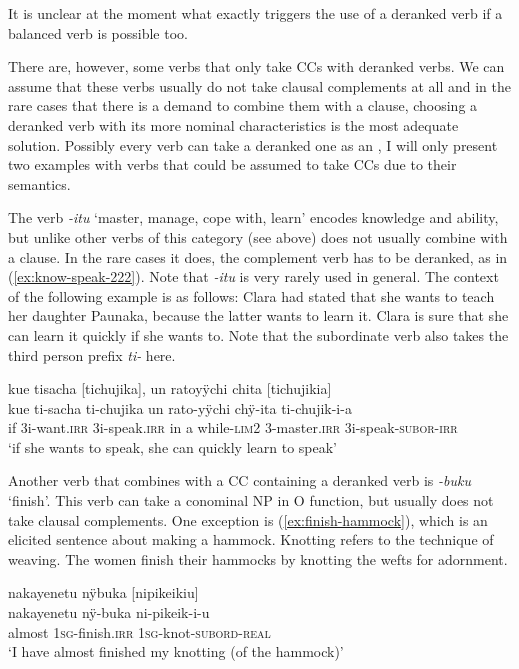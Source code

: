 It is unclear at the moment what exactly triggers the use of a deranked verb if a balanced verb is possible too. 

There are, however, some verbs that only take CCs with deranked verbs. We can assume that these verbs usually do not take clausal complements at all and in the rare cases that there is a demand to combine them with a clause, choosing a deranked verb with its more nominal characteristics is the most adequate solution. Possibly every  verb can take a deranked one as an , I will only present two examples with verbs that could be assumed to take CCs due to their semantics. 

The verb \textit{-itu} ‘master, manage, cope with, learn’ encodes knowledge and ability, but unlike other verbs of this category (see  above) does not usually combine with a clause. In the rare cases it does, the complement verb has to be deranked, as in (\ref{ex:know-speak-222}). Note that \textit{-itu} is very rarely used in general. The context of the following example is as follows: Clara had stated that she wants to teach her daughter Paunaka, because the latter wants to learn it. Clara is sure that she can learn it quickly if she wants to. Note that the subordinate verb also takes the third person prefix \textit{ti-} here.

\ea\label{ex:know-speak-222}
\begingl
\glpreamble kue tisacha \textup{[}tichujika\textup{]}, un ratoyÿchi chita \textup{[}tichujikia\textup{]}\\
\gla kue ti-sacha ti-chujika {un rato}-yÿchi chÿ-ita ti-chujik-i-a\\
\glb if 3i-want.\textsc{irr} 3i-speak.\textsc{irr} {in a while}-\textsc{lim}2 3-master.\textsc{irr} 3i-speak-\textsc{subor}-\textsc{irr}\\
\glft ‘if she wants to speak, she can quickly learn to speak’
\endgl
\trailingcitation{[cux-c120414ls-2.327]}
\xe

Another verb that combines with a CC containing a deranked verb is \textit{-buku} ‘finish’. This verb can take a conominal NP in O function, but usually does not take clausal complements. One exception is (\ref{ex:finish-hammock}), which is an elicited sentence about making a hammock. Knotting refers to the technique of weaving. The women finish their hammocks by knotting the wefts for adornment.

\ea\label{ex:finish-hammock}
\begingl
\glpreamble nakayenetu nÿbuka \textup{[}nipikeikiu\textup{]}\\
\gla nakayenetu nÿ-buka ni-pikeik-i-u\\
\glb almost 1\textsc{sg}-finish.\textsc{irr} 1\textsc{sg}-knot-\textsc{subord}-\textsc{real}\\
\glft ‘I have almost finished my knotting (of the hammock)’
\endgl
\trailingcitation{[rxx-e181022le]}
\xe
{}


